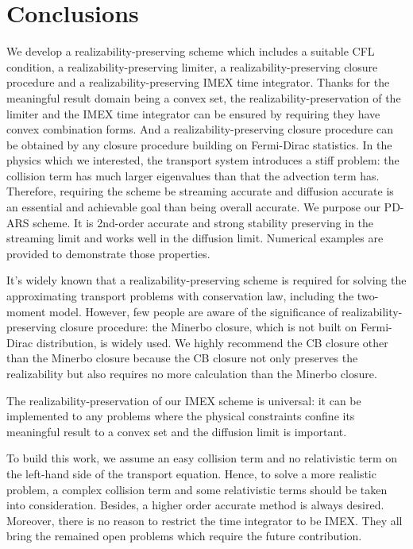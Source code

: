 \section{Conclusions}
\label{sec:conclusions}

We develop a realizability-preserving scheme which includes a suitable CFL condition, a realizability-preserving limiter, a realizability-preserving closure procedure and a realizability-preserving IMEX time integrator.
Thanks for the meaningful result domain being a convex set, the realizability-preservation of the limiter and the IMEX time integrator can be ensured by requiring they have convex combination forms.
And a realizability-preserving closure procedure can be obtained by any closure procedure building on Fermi-Dirac statistics.
In the physics which we interested, the transport system introduces a stiff problem: the collision term has much larger eigenvalues than that the advection term has.
Therefore, requiring the scheme be streaming accurate and diffusion accurate is an essential and achievable goal than being overall accurate.
We purpose our PD-ARS scheme. It is 2nd-order accurate and strong stability preserving in the streaming limit and works well in the diffusion limit. Numerical examples are provided to demonstrate those properties.

It's widely known that a realizability-preserving scheme is required for solving the approximating transport problems with conservation law, including the two-moment model.
However, few people are aware of the significance of realizability-preserving closure procedure: the Minerbo closure, which is not built on Fermi-Dirac distribution, is widely used.
We highly recommend the CB closure other than the Minerbo closure because the CB closure not only preserves the realizability but also requires no more calculation than the Minerbo closure.
 
The realizability-preservation of our IMEX scheme is universal: it can be implemented to any problems where the physical constraints confine its meaningful result to a convex set and the diffusion limit is important. 

To build this work, we assume an easy collision term and no relativistic term on the left-hand side of the transport equation.
Hence, to solve a more realistic problem, a complex collision term and some relativistic terms should be taken into consideration.
Besides, a higher order accurate method is always desired.
Moreover, there is no reason to restrict the time integrator to be IMEX.
They all bring the remained open problems which require the future contribution. 